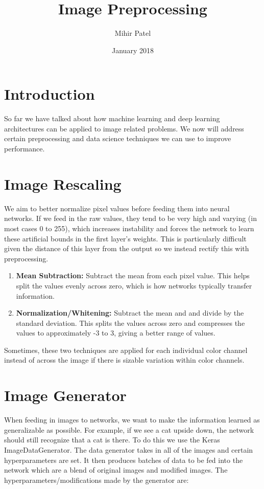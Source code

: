 \documentclass{article}
\title{Image Preprocessing}
\author{Mihir Patel}
\date{January 2018}
\begin{document}
\maketitle

\section{Introduction}

So far we have talked about how machine learning and deep learning architectures can be applied to image related problems. We now will address certain preprocessing and data science techniques we can use to improve performance.

\section{Image Rescaling}
We aim to better normalize pixel values before feeding them into neural networks. If we feed in the raw values, they tend to be very high and varying (in most cases 0 to 255), which increases instability and forces the network to learn these artificial bounds in the first layer's weights. This is particularly difficult given the distance of this layer from the output so we instead rectify this with preprocessing.

\begin{enumerate}
  \item \textbf{Mean Subtraction:} Subtract the mean from each pixel value. This helps split the values evenly across zero, which is how networks typically transfer information.
  \item \textbf{Normalization/Whitening:} Subtract the mean and and divide by the standard deviation. This splits the values across zero and compresses the values to approximately -3 to 3, giving a better range of values.
\end{enumerate}

Sometimes, these two techniques are applied for each individual color channel instead of across the image if there is sizable variation within color channels.

\section{Image Generator}
When feeding in images to networks, we want to make the information learned as generalizable as possible. For example, if we see a cat upside down, the network should still recognize that a cat is there. To do this we use the Keras ImageDataGenerator. The data generator takes in all of the images and certain hyperparameters are set. It then produces batches of data to be fed into the network which are a blend of original images and modified images. The hyperparameters/modifications made by the generator are:
\end{document}
